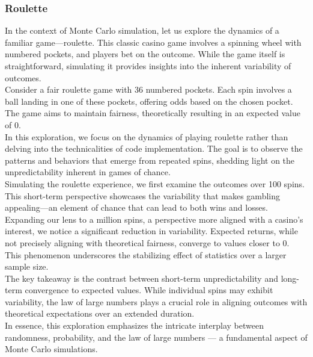 \documentclass[12pt]{article}
\begin{document}
    \subsubsection{Roulette}
    In the context of Monte Carlo simulation, let us explore the dynamics of a familiar game—roulette. This classic casino game involves a spinning wheel with numbered pockets, and players bet on the outcome. While the game itself is straightforward, simulating it provides insights into the inherent variability of outcomes.\\
    Consider a fair roulette game with 36 numbered pockets. Each spin involves a ball landing in one of these pockets, offering odds based on the chosen pocket. The game aims to maintain fairness, theoretically resulting in an expected value of 0.\\
    In this exploration, we focus on the dynamics of playing roulette rather than delving into the technicalities of code implementation. The goal is to observe the patterns and behaviors that emerge from repeated spins, shedding light on the unpredictability inherent in games of chance.\\
    Simulating the roulette experience, we first examine the outcomes over 100 spins. This short-term perspective showcases the variability that makes gambling appealing—an element of chance that can lead to both wins and losses.\\
    Expanding our lens to a million spins, a perspective more aligned with a casino's interest, we notice a significant reduction in variability. Expected returns, while not precisely aligning with theoretical fairness, converge to values closer to 0. This phenomenon underscores the stabilizing effect of statistics over a larger sample size.\\
    The key takeaway is the contrast between short-term unpredictability and long-term convergence to expected values. While individual spins may exhibit variability, the law of large numbers plays a crucial role in aligning outcomes with theoretical expectations over an extended duration.\\
    In essence, this exploration emphasizes the intricate interplay between randomness, probability, and the law of large numbers — a fundamental aspect of Monte Carlo simulations.\\
\end{document}
